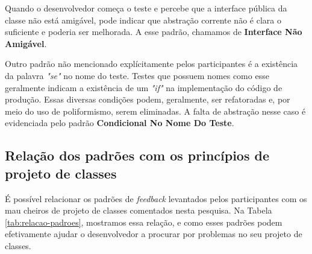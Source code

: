 \documentclass[conference]{IEEEtran}
\begin{document}
Quando o desenvolvedor começa o teste e percebe que a interface pública da classe
não está amigável, pode indicar que abstração
corrente não é clara o suficiente e poderia ser melhorada. A esse padrão,
chamamos de \textbf{Interface Não Amigável}.

Outro padrão não mencionado explícitamente pelos participantes 
é a existência da palavra \textit{"se"} no nome do teste. Testes que
possuem nomes como esse geralmente indicam a existência de um \textit{"if"} na implementação
do código de produção. Essas diversas condições podem, geralmente, ser refatoradas e,
por meio do uso de poliformismo, serem eliminadas. A falta de abstração nesse caso
é evidenciada pelo padrão \textbf{Condicional No Nome Do Teste}.

\subsection{Relação dos padrões com os princípios de projeto de classes}

É possível relacionar os padrões de \textit{feedback} levantados pelos participantes
com os mau cheiros de projeto de classes comentados nesta pesquisa. Na Tabela \ref{tab:relacao-padroes},
mostramos essa relação, e como esses padrões podem efetivamente ajudar o desenvolvedor
a procurar por problemas no seu projeto de classes.
\end{document}
